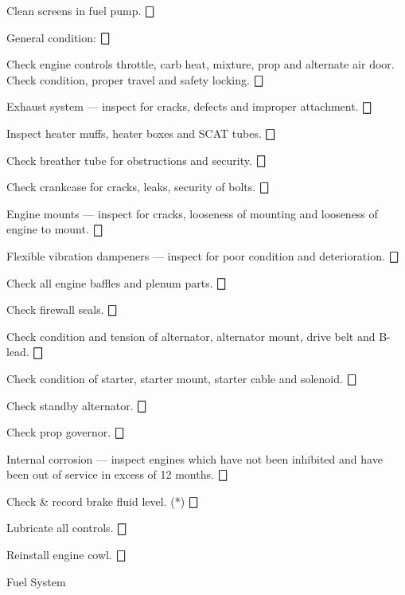 \begin{enumerate*}
\begin{enumerate*}
		\item Clean screens in fuel pump. \dotfill $\bigbox$
		\item General condition: \dotfill $\bigbox$
		\begin{enumerate*}
		\item Check engine controls throttle, carb heat, mixture, prop and alternate air door. Check condition, proper travel and safety locking. \dotfill $\bigbox$
		\item Exhaust system --- inspect for cracks, defects and improper attachment. \dotfill $\bigbox$
		\item Inspect heater muffs, heater boxes and SCAT tubes. \dotfill $\bigbox$
		\item Check breather tube for obstructions and security. \dotfill $\bigbox$
		\item Check crankcase for cracks, leaks, security of bolts. \dotfill $\bigbox$
		\item Engine mounts --- inspect for cracks, looseness of mounting and looseness of engine to mount. \dotfill $\bigbox$
		\item Flexible vibration dampeners --- inspect for poor condition and deterioration. \dotfill $\bigbox$
		\item Check all engine baffles and plenum parts. \dotfill $\bigbox$
		\item Check firewall seals. \dotfill $\bigbox$
		\item Check condition and tension of alternator, alternator mount, drive belt and B-lead. \dotfill $\bigbox$
		\item Check condition of starter, starter mount, starter cable and solenoid. \dotfill $\bigbox$
		\item Check standby alternator. \dotfill $\bigbox$
		\item Check prop governor. \dotfill $\bigbox$
		\item Internal corrosion --- inspect engines which have not been inhibited and have been out of service in excess of 12 months. \dotfill $\bigbox$
	  \end{enumerate*}
		\item Check \& record brake fluid level. (*) \dotfill $\bigbox$
		\item Lubricate all controls. \dotfill $\bigbox$
		\item Reinstall engine cowl. \dotfill $\bigbox$
	\end{enumerate*}
	\item{Fuel System} 
	\begin{enumerate*}

\end{enumerate*}
\end{enumerate*}
